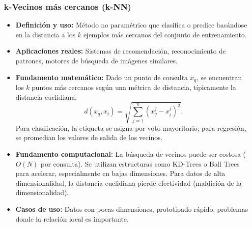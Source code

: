 \documentclass[12pt,a4paper,openany,oneside]{book}
\begin{document}
\subsubsection{k-Vecinos más cercanos (k-NN)}
\begin{itemize}
    \item \textbf{Definición y uso:} Método no paramétrico que clasifica o predice basándose en la distancia a los \(k\) ejemplos más cercanos del conjunto de entrenamiento.
    \item \textbf{Aplicaciones reales:} Sistemas de recomendación, reconocimiento de patrones, motores de búsqueda de imágenes similares.
    \item \textbf{Fundamento matemático:} Dado un punto de consulta \(x_q\), se encuentran los \(k\) puntos más cercanos según una métrica de distancia, típicamente la distancia euclidiana:
    \[
    d(x_q, x_i) = \sqrt{\sum_{j=1}^n (x_q^j - x_i^j)^2}.
    \]
    Para clasificación, la etiqueta se asigna por voto mayoritario; para regresión, se promedian los valores de salida de los vecinos.
    \item \textbf{Fundamento computacional:} La búsqueda de vecinos puede ser costosa (\(O(N)\) por consulta). Se utilizan estructuras como KD-Trees o Ball Trees para acelerar, especialmente en bajas dimensiones. Para datos de alta dimensionalidad, la distancia euclidiana pierde efectividad (maldición de la dimensionalidad).
    \item \textbf{Casos de uso:} Datos con pocas dimensiones, prototipado rápido, problemas donde la relación local es importante.
\end{itemize}
\end{document}
